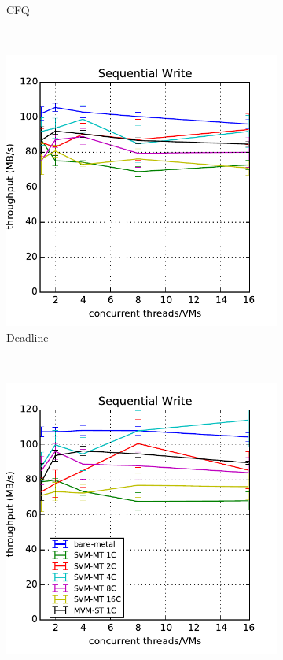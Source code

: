 \documentclass{acmsig}
\begin{document}
\begin{figure}[t]
\begin{subfigure}[b]{0.3\textwidth}
     \caption{CFQ}
     \label{fig:aggthroughput_cfq_write}
   \end{subfigure}%
   ~ %
   \begin{subfigure}[b]{0.3\textwidth}
     \includegraphics[width=\textwidth]{figures/throughput_deadline_write.pdf}
     \caption{Deadline}
     \label{fig:aggthroughput_deadline_write}
   \end{subfigure}
    ~ %
   \begin{subfigure}[b]{0.3\textwidth}
     \includegraphics[width=\textwidth]{figures/throughput_noop_write.pdf}

\end{subfigure}
\end{figure}
\end{document}
